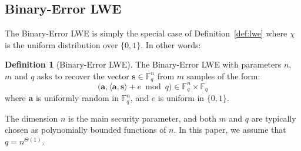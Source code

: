 \documentclass[a4paper]{article}
\theoremstyle{definition}
\newtheorem{definition}{Definition}[section]
\theoremstyle{remark}
\renewcommand{\vec}{\mathbf}
\newcommand{\F}{\mathbb{F}}
\begin{document}




\subsection{Binary-Error LWE} 

The Binary-Error LWE is simply the special case of
Definition~\ref{def:lwe} where $\chi$ is the uniform distribution over
$\{0,1\}$. In other words:
\begin{definition}[Binary-Error LWE]
The Binary-Error LWE with parameters $n$, $m$ and $q$ asks to recover the
vector $\vec s\in\F_q^n$ from $m$ samples of the form:
\[
\big(\vec a, \langle\vec a, \vec s\rangle + e \bmod q\big) \in
\F_q^n\times \F_q
\]
where $\vec a$ is uniformly random in $\F_q^n$, and $e$ is uniform in
$\{0,1\}$.
\end{definition} 

The dimension $n$ is the main security parameter, and both $m$ and $q$
are typically chosen as polynomially bounded functions of $n$. In this
paper, we assume that $q = n^{\Theta(1)}$.
\end{document}
